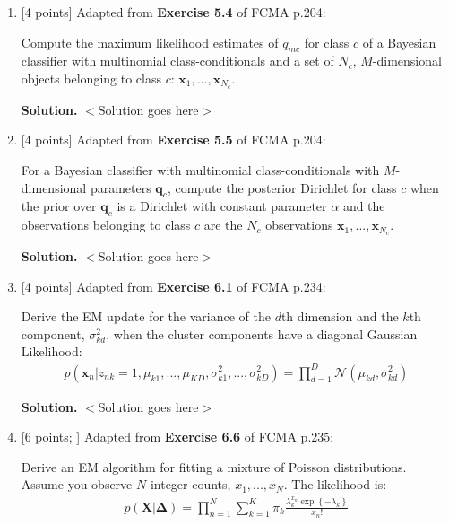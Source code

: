 \documentclass[10pt]{article}
\begin{document}
\newpage
\begin{enumerate}


\item \label{prob:bayesgauss} [4 points]
Adapted from {\bf Exercise 5.4} of FCMA p.204:

Compute the maximum likelihood estimates of $q_{mc}$ for class $c$ of a Bayesian classifier with multinomial class-conditionals and a set of $N_c$, $M$-dimensional objects belonging to class $c$: $\mathbf{x}_1, ..., \mathbf{x}_{N_c}$.

{\bf Solution.} $<$Solution goes here$>$



\item \label{prob:bayesmultinomial} [4 points]
Adapted from {\bf Exercise 5.5} of FCMA p.204:

For a Bayesian classifier with multinomial class-conditionals with $M$-dimensional parameters $\mathbf{q}_c$, compute the posterior Dirichlet for class $c$ when the prior over $\mathbf{q}_c$ is a Dirichlet with constant parameter $\alpha$ and the observations belonging to class $c$ are the $N_c$ observations $\mathbf{x}_1, ..., \mathbf{x}_{N_c}$.

{\bf Solution.} $<$Solution goes here$>$



\item \label{prob:emvariance} [4 points]
Adapted from {\bf Exercise 6.1} of FCMA p.234:

Derive the EM update for the variance of the $d$th dimension and the $k$th component, $\sigma^2_{kd}$, when the cluster components have a diagonal Gaussian Likelihood:
\begin{eqnarray*}
p(\mathbf{x}_n | z_{nk} = 1, \mu_{k1}, ..., \mu_{KD}, \sigma^2_{k1}, ..., \sigma^2_{kD}) = \prod_{d=1}^D \mathcal{N}(\mu_{kd}, \sigma^2_{kd})
\end{eqnarray*}

{\bf Solution.} $<$Solution goes here$>$



\item \label{prob:empoisson} [6 points; ]
Adapted from {\bf Exercise 6.6} of FCMA p.235:

Derive an EM algorithm for fitting a mixture of Poisson distributions.  Assume you observe $N$ integer counts, $x_1, ..., x_N$.  The likelihood is:
\begin{eqnarray*}
p(\mathbf{X}|\boldsymbol{\Delta}) = \prod_{n=1}^{N} \sum_{k=1}^{K} \pi_k \frac{\lambda_{k}^{x_n} \exp \left\{ - \lambda_k \right\}}{x_{n}!}
\end{eqnarray*}


\end{enumerate}
\end{document}
